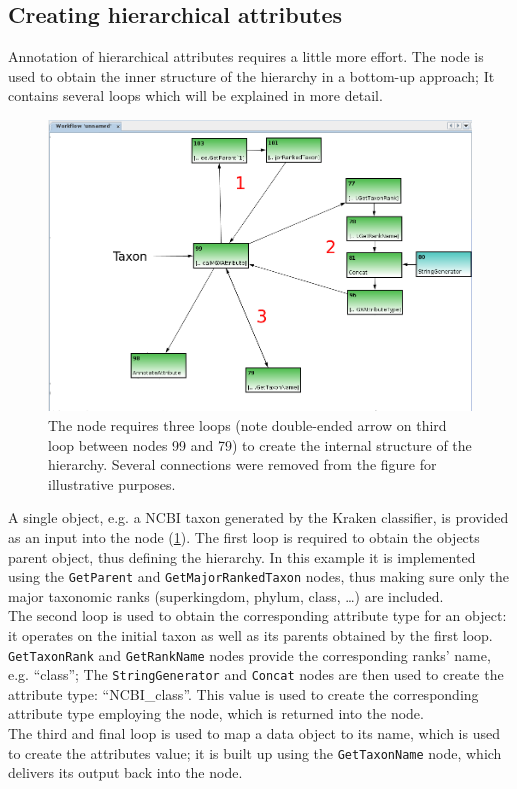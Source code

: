 \subsection{Creating hierarchical attributes}

Annotation of hierarchical attributes requires a little more effort. The  node
is used to obtain the inner structure of the hierarchy in a bottom-up approach; It contains several loops which
will be explained in more detail.

\begin{figure}[H]
\centering
\includegraphics[width=\textwidth]{img/conveyor/TreeAnnot}
\caption[Hierarchical attributes]{The  node requires three loops (note double-ended arrow on third loop between nodes 99 and 79)
to create the internal structure of the hierarchy. Several connections were removed from the figure
for illustrative purposes.}
\label{annot5}
\end{figure}

A single object, e.g. a NCBI taxon generated by the Kraken\cite{KRAKEN} classifier, is provided as an input
into the node (\ref{annot5}). 
The first loop is required to obtain the objects parent object, thus defining the hierarchy. In this example
it is implemented using the \texttt{GetParent} and \texttt{GetMajorRankedTaxon} nodes, thus making sure only
the major taxonomic ranks (superkingdom, phylum, class, \dots) are included.\\
The second loop is used to obtain the corresponding attribute type for an object: it operates on the initial taxon as well as its parents
obtained by the first loop. \texttt{GetTaxonRank} and \texttt{GetRankName} nodes provide the corresponding
ranks' name, e.g. ``class''; The \texttt{StringGenerator} and \texttt{Concat} nodes are then used to create the
attribute type: ``NCBI\_class''. This value is used to create the corresponding attribute type employing the
 node, which is returned into the  node.\\
The third and final loop is used to map a data object to its name, which is used to create the attributes value;
it is built up using the \texttt{GetTaxonName} node, which delivers its output back into the node.\\

